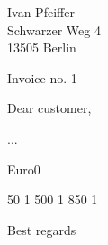 \documentclass{letter}
\date{31-May-2010}
\begin{document}
 
\begin{letter}{Ivan Pfeiffer \\ 
               Schwarzer Weg 4 \\ 
               13505 Berlin} 
\opening{Invoice no. 1} 
Dear customer,

... 

\begin{invoice}{Euro}{0} 

     {50} {1} 
     {500} {1} 
     {850} {1} 

\end{invoice} 

\closing{Best regards} 
\end{letter} 
\end{document}
